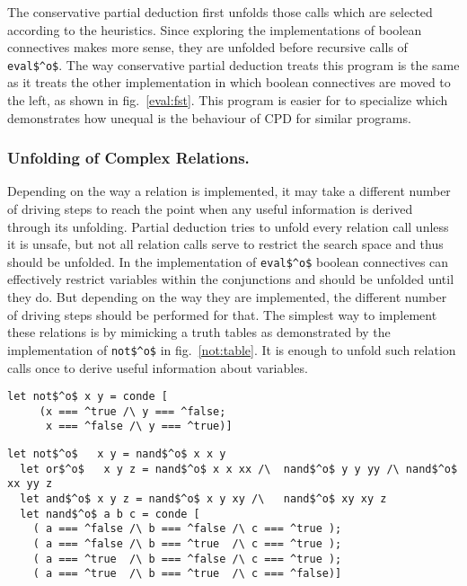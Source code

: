 The conservative partial deduction first unfolds those calls which are selected according to the heuristics.
Since exploring the implementations of boolean connectives makes more sense, they are unfolded before recursive calls of \lstinline{eval$^o$}.
The way conservative partial deduction treats this program is the same as it treats the other implementation in which boolean connectives
are moved to the left, as shown in fig.~\ref{eval:fst}.
This program is easier for \ecce to specialize which demonstrates how unequal is the behaviour of CPD for similar programs.

\subsubsection{Unfolding of Complex Relations.}

Depending on the way a relation is implemented, it may take a different number of driving steps to reach the point when any useful information is derived through its unfolding.
Partial deduction tries to unfold every relation call unless it is unsafe, but not all relation calls serve to restrict the search space and thus should be unfolded.
In the implementation of \lstinline{eval$^o$} boolean connectives can effectively restrict variables within the conjunctions and should be unfolded until they do.
But depending on the way they are implemented, the different number of driving steps should be performed for that.
The simplest way to implement these relations is by mimicking a truth tables as demonstrated by the implementation of \lstinline{not$^o$} in fig.~\ref{not:table}.
It is enough to unfold such relation calls once to derive useful information about variables.

\begin{figure*}[!t]
  \centering
  \begin{minipage}{0.7\textwidth}
    \begin{lstlisting}[label={not:table}, caption={Implementation of boolean \lstinline{not} as a table}, captionpos=b, frame=tb]
  let not$^o$ x y = conde [
     (x === ^true /\ y === ^false;
      x === ^false /\ y === ^true)]
    \end{lstlisting}
  \end{minipage}
  \begin{minipage}{0.9\textwidth}
    \begin{lstlisting}[label={not:nando}, caption={Implementation of boolean operation via \lstinline{nand}}, captionpos=b, frame=tb]
  let not$^o$   x y = nand$^o$ x x y
  let or$^o$   x y z = nand$^o$ x x xx /\  nand$^o$ y y yy /\ nand$^o$ xx yy z
  let and$^o$ x y z = nand$^o$ x y xy /\   nand$^o$ xy xy z
  let nand$^o$ a b c = conde [
    ( a === ^false /\ b === ^false /\ c === ^true );
    ( a === ^false /\ b === ^true  /\ c === ^true );
    ( a === ^true  /\ b === ^false /\ c === ^true );
    ( a === ^true  /\ b === ^true  /\ c === ^false)]
    \end{lstlisting}
  \end{minipage}
\end{figure*}


